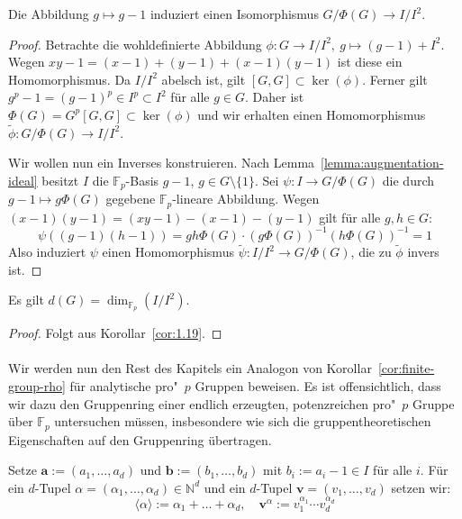\documentclass[11pt,a4paper,openany]{memoir}
\begin{document}
\begin{proposition}\label{Ex1}
Die Abbildung $g\mapsto g-1$ induziert einen Isomorphismus $G/\Phi(G)\to I/I^2$.
\end{proposition}

\begin{proof}
Betrachte die wohldefinierte Abbildung $\phi:G\to I/I^2,\ g\mapsto (g-1)+I^2$. Wegen $xy-1=(x-1)+(y-1)+(x-1)(y-1)$ ist diese ein Homomorphismus. Da $I/I^2$ abelsch ist, gilt $[G,G]\subset\ker(\phi)$. Ferner gilt $g^p-1=(g-1)^p\in I^p\subset I^2$ für alle $g\in G$. Daher ist $\Phi(G)=G^p[G,G]\subset\ker(\phi)$ und wir erhalten einen Homomorphismus $\tilde{\phi}:G/\Phi(G)\to I/I^2$. 

Wir wollen nun ein Inverses konstruieren. Nach Lemma~\ref{lemma:augmentation-ideal} besitzt $I$ die $\mathbb{F}_p$-Basis $g-1$, $g\in G\setminus\{1\}$. Sei $\psi:I\to G/\Phi(G)$ die durch $g-1\mapsto g\Phi(G)$ gegebene $\mathbb{F}_p$-lineare Abbildung. Wegen $(x-1)(y-1)=(xy-1)-(x-1)-(y-1)$ gilt für alle $g,h\in G$:
\[\psi((g-1)(h-1))=gh\Phi(G)\cdot  (g\Phi(G))^{-1}(h\Phi(G))^{-1}=1 \]
Also induziert $\psi$ einen Homomorphismus $\tilde{\psi}:I/I^2\to G/\Phi(G)$, die zu $\tilde{\phi}$ invers ist.
\end{proof}

\begin{corollary}\label{cor:Ex1}
Es gilt $d(G) = \dim_{\mathbb{F}_p}(I/I^2)$.
\end{corollary}

\begin{proof}
Folgt aus Korollar~\ref{cor:1.19}.
\end{proof}

\paragraph{} Wir werden nun den Rest des Kapitels ein Analogon von Korollar~\ref{cor:finite-group-rho} für analytische pro"~$p$ Gruppen beweisen. Es ist offensichtlich, dass wir dazu den Gruppenring einer endlich erzeugten, potenzreichen pro"~$p$ Gruppe über $\mathbb{F}_p$ untersuchen müssen, insbesondere wie sich die gruppentheoretischen Eigenschaften auf den Gruppenring übertragen.

\begin{definition}
Setze $\mathbf{a} :=(a_1,\ldots,a_d)$ und $\mathbf{b} :=(b_1,\ldots,b_d)$ mit $b_i:=a_i-1\in I$ für alle $i$. Für ein $d$-Tupel $\alpha=(\alpha_1,\ldots,\alpha_d)\in\mathbb{N}^d$ und ein $d$-Tupel $\mathbf{v}=(v_1,\ldots,v_d)$ setzen wir:
\[\langle\alpha\rangle :=\alpha_1+\ldots+\alpha_d,\quad \mathbf{v}^\alpha := v_1^{\alpha_1}\cdots v_d^{\alpha_d} \]
\end{definition}
\end{document}
